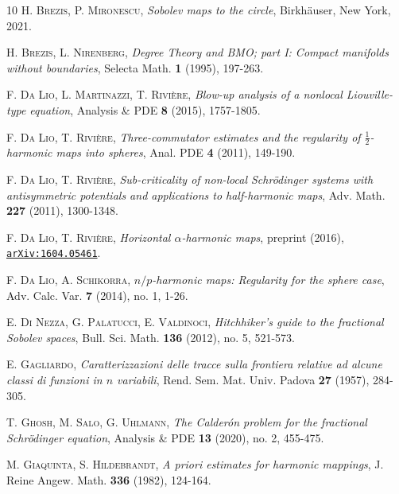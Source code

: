 \documentclass[12pt, a4paper]{article}
\renewcommand{\(}{\left(}
\renewcommand{\)}{\right)}
\begin{document}
\begin{thebibliography}{10}
 \textsc{H. Brezis, P. Mironescu}, \emph{Sobolev maps to the circle}, Birkh\"auser, New York, 2021.

 \textsc{H. Brezis, L. Nirenberg}, \emph{Degree Theory and BMO; part I: Compact manifolds without boundaries}, Selecta Math. \textbf{1} (1995), 197-263.

 \textsc{F. Da Lio, L. Martinazzi, T. Rivi\`ere}, \emph{Blow-up analysis of a nonlocal Liouville-type equation}, Analysis \& PDE \textbf{8} (2015), 1757-1805.

 \textsc{F. Da Lio, T. Rivi\`ere}, \emph{Three-commutator estimates and the regularity of $\frac{1}{2}$-harmonic maps into spheres}, Anal. PDE \textbf{4} (2011), 149-190.

 \textsc{F. Da Lio, T. Rivi\`ere}, \emph{Sub-criticality of non-local Schr\"odinger systems with antisymmetric potentials and applications to half-harmonic maps}, Adv. Math. \textbf{227} (2011), 1300-1348.


 \textsc{F. Da Lio, T. Rivi\`ere}, \emph{Horizontal $\alpha$-harmonic maps}, preprint (2016), \href{https://arxiv.org/pdf/1604.05461}{\texttt{arXiv:1604.05461}}. 

 \textsc{F. Da Lio, A. Schikorra}, \emph{$n/p$-harmonic maps: Regularity for the sphere case}, Adv. Calc. Var. \textbf{7} (2014), no. 1, 1-26.


 \textsc{E. Di Nezza, G. Palatucci, E. Valdinoci}, \emph{Hitchhiker’s guide to the fractional Sobolev spaces}, Bull. Sci. Math. \textbf{136} (2012), no. 5, 521-573.

 \textsc{E. Gagliardo}, \emph{Caratterizzazioni delle tracce sulla frontiera relative ad alcune classi di funzioni in $n$ variabili}, Rend. Sem. Mat. Univ. Padova \textbf{27} (1957), 284-305.

 \textsc{T. Ghosh, M. Salo, G. Uhlmann}, \emph{The Calder\'on problem for the fractional Schr\"odinger equation}, Analysis \& PDE \textbf{13} (2020), no. 2, 455-475.

 \textsc{M. Giaquinta, S. Hildebrandt}, \emph{A priori estimates for harmonic mappings}, J. Reine Angew. Math. \textbf{336} (1982), 124-164.



\end{thebibliography}
\end{document}
